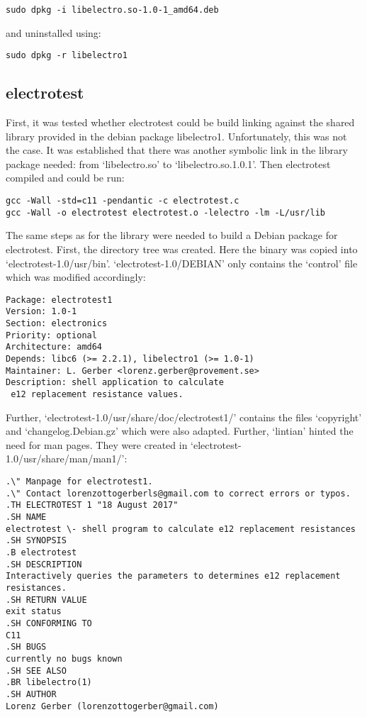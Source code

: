 \documentclass[a4paper,11pt,twoside]{article}
\begin{document}
\begin{verbatim}
sudo dpkg -i libelectro.so-1.0-1_amd64.deb
\end{verbatim}
and uninstalled using:
\begin{verbatim}
sudo dpkg -r libelectro1
\end{verbatim}

\subsection{electrotest}
First, it was tested whether electrotest could be build linking against the
shared library provided in the debian package libelectro1. Unfortunately, this
was not the case. It was established that there was another symbolic link in
the library package needed: from `libelectro.so' to `libelectro.so.1.0.1'.
Then electrotest compiled and could be run:
\begin{verbatim}
gcc -Wall -std=c11 -pendantic -c electrotest.c
gcc -Wall -o electrotest electrotest.o -lelectro -lm -L/usr/lib
\end{verbatim}

The same steps as for the library were needed to build a Debian package for
electrotest. First, the directory tree was created. Here the binary was copied
into `electrotest-1.0/usr/bin'. `electrotest-1.0/DEBIAN' only contains the `control'
file which was modified accordingly:
\begin{verbatim}
Package: electrotest1
Version: 1.0-1
Section: electronics
Priority: optional
Architecture: amd64
Depends: libc6 (>= 2.2.1), libelectro1 (>= 1.0-1)
Maintainer: L. Gerber <lorenz.gerber@provement.se>
Description: shell application to calculate
 e12 replacement resistance values.
\end{verbatim}
Further, `electrotest-1.0/usr/share/doc/electrotest1/' contains the files
`copyright' and `changelog.Debian.gz' which were also adapted. Further, `lintian'
hinted the need for man pages. They were created in `electrotest-1.0/usr/share/man/man1/':
\begin{verbatim}
.\" Manpage for electrotest1.
.\" Contact lorenzottogerberls@gmail.com to correct errors or typos.
.TH ELECTROTEST 1 "18 August 2017"
.SH NAME
electrotest \- shell program to calculate e12 replacement resistances
.SH SYNOPSIS
.B electrotest
.SH DESCRIPTION
Interactively queries the parameters to determines e12 replacement resistances.
.SH RETURN VALUE
exit status
.SH CONFORMING TO
C11
.SH BUGS
currently no bugs known
.SH SEE ALSO
.BR libelectro(1)
.SH AUTHOR
Lorenz Gerber (lorenzottogerber@gmail.com)
\end{verbatim}
\end{document}

